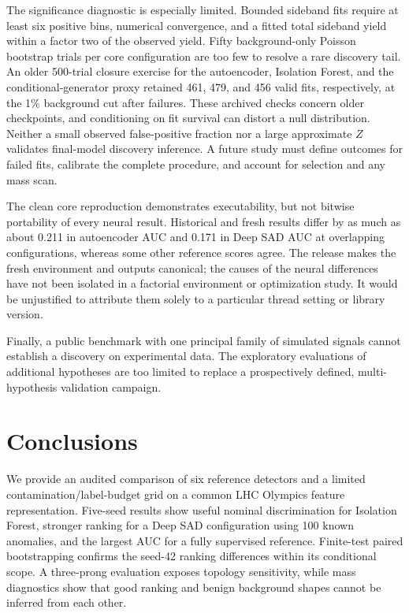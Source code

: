 \documentclass[reprint,aps,pra,amsmath,amssymb,floatfix,raggedbottom]{revtex4-2}
\begin{document}
The significance diagnostic is especially limited. Bounded sideband fits require at least six positive bins, numerical convergence, and a fitted total sideband yield within a factor two of the observed yield. Fifty background-only Poisson bootstrap trials per core configuration are too few to resolve a rare discovery tail. An older 500-trial closure exercise for the autoencoder, Isolation Forest, and the conditional-generator proxy retained 461, 479, and 456 valid fits, respectively, at the 1\% background cut after failures. These archived checks concern older checkpoints, and conditioning on fit survival can distort a null distribution. Neither a small observed false-positive fraction nor a large approximate $Z$ validates final-model discovery inference. A future study must define outcomes for failed fits, calibrate the complete procedure, and account for selection and any mass scan.

The clean core reproduction demonstrates executability, but not bitwise portability of every neural result. Historical and fresh results differ by as much as about 0.211 in autoencoder AUC and 0.171 in Deep SAD AUC at overlapping configurations, whereas some other reference scores agree. The release makes the fresh environment and outputs canonical; the causes of the neural differences have not been isolated in a factorial environment or optimization study. It would be unjustified to attribute them solely to a particular thread setting or library version.

Finally, a public benchmark with one principal family of simulated signals cannot establish a discovery on experimental data. The exploratory evaluations of additional hypotheses are too limited to replace a prospectively defined, multi-hypothesis validation campaign.

\section{Conclusions}
We provide an audited comparison of six reference detectors and a limited contamination/label-budget grid on a common LHC Olympics feature representation. Five-seed results show useful nominal discrimination for Isolation Forest, stronger ranking for a Deep SAD configuration using 100 known anomalies, and the largest AUC for a fully supervised reference. Finite-test paired bootstrapping confirms the seed-42 ranking differences within its conditional scope. A three-prong evaluation exposes topology sensitivity, while mass diagnostics show that good ranking and benign background shapes cannot be inferred from each other.
\end{document}
